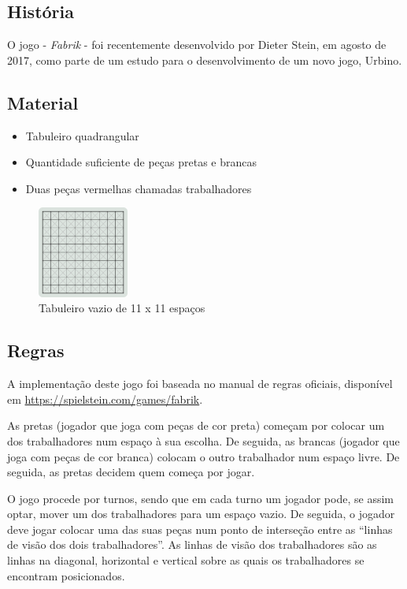 \documentclass[a4paper]{article}
\begin{document}
\subsection{História}
O jogo - \textit{Fabrik} - foi recentemente desenvolvido por Dieter Stein, em agosto de 2017, como parte de um estudo para o desenvolvimento de um novo jogo, Urbino.

\subsection{Material}
\begin{itemize}
	\item Tabuleiro quadrangular
	\item Quantidade suficiente de peças pretas e brancas
	\item Duas peças vermelhas chamadas trabalhadores
\end{itemize}

\begin{figure}[h!]
\begin{center}
\includegraphics[height=3cm,width=3cm]{images/fabrik_empty_board.png}
\caption{Tabuleiro vazio de 11 x 11 espaços}
\end{center}
\end{figure}

\subsection{Regras}
A implementação deste jogo foi baseada no manual de regras oficiais, disponível em \href{https://spielstein.com/games/fabrik}{https://spielstein.com/games/fabrik}.

As pretas (jogador que joga com peças de cor preta) começam por colocar um dos trabalhadores num espaço à sua escolha. De seguida, as brancas (jogador que joga com peças de cor branca) colocam o outro trabalhador num espaço livre. De seguida, as pretas decidem quem começa por jogar.

O jogo procede por turnos, sendo que em cada turno um jogador pode, se assim optar, mover um dos trabalhadores para um espaço vazio. De seguida, o jogador deve jogar colocar uma das suas peças num ponto de interseção entre as “linhas de visão dos dois trabalhadores”. As linhas de visão dos trabalhadores são as linhas na diagonal, horizontal e vertical sobre as quais os trabalhadores se encontram posicionados.
\end{document}
